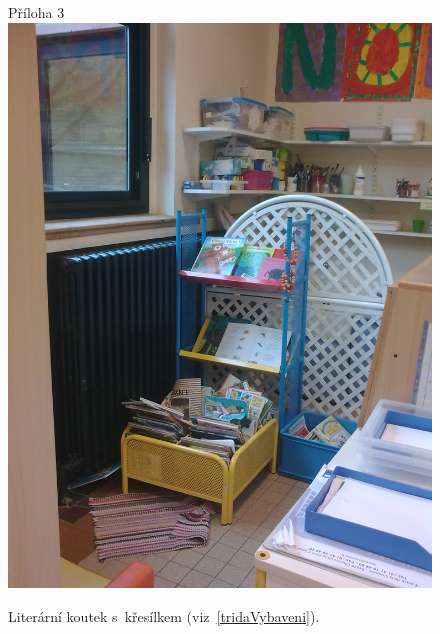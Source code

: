	\begin{figure}[tb]
		\centering
		Příloha 3\\
		\includegraphics[height = 0.35\textheight]{./fotky/Obr3.jpg}
		\caption{
			Literární koutek s~křesílkem (viz~\ref{tridaVybaveni}).
		}
		\label{Obr3}
	\end{figure}

